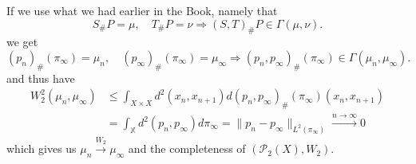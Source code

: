 \documentclass[15pt]{article}
\begin{document}
If we use what we had earlier in the Book, namely that $$S_{\#}P = \mu, \quad T_{\#}P = \nu \Rightarrow (S,T)_{\#}P \in \Gamma(\mu,\nu).$$ we get $$(p_n)_{\#}(\pi_\infty) = \mu_n, \quad (p_\infty)_{\#}(\pi_\infty) = \mu_\infty \Rightarrow (p_n,p_{\infty})_{\#}(\pi_\infty) \in \Gamma(\mu_n,\mu_\infty).$$
and thus have \begin{align*}W_2^2(\mu_n,\mu_\infty) &\leq \int_{X \times X} d^2(x_n,x_{n+1}) d(p_n,p_\infty)_{\#}(\pi_\infty)(x_n,x_{n+1}) \\ &= \int_{\mathbb{X}} d^2(p_n,p_\infty) d\pi_\infty = \|p_n-p_\infty\|_{L^2(\pi_\infty)} \xrightarrow{n \to \infty} 0\end{align*} 
which gives us $\mu_n \xrightarrow{W_2} \mu_\infty$ and the completeness of $(\mathcal{P}_2(X), W_2)$. 
\end{document}
